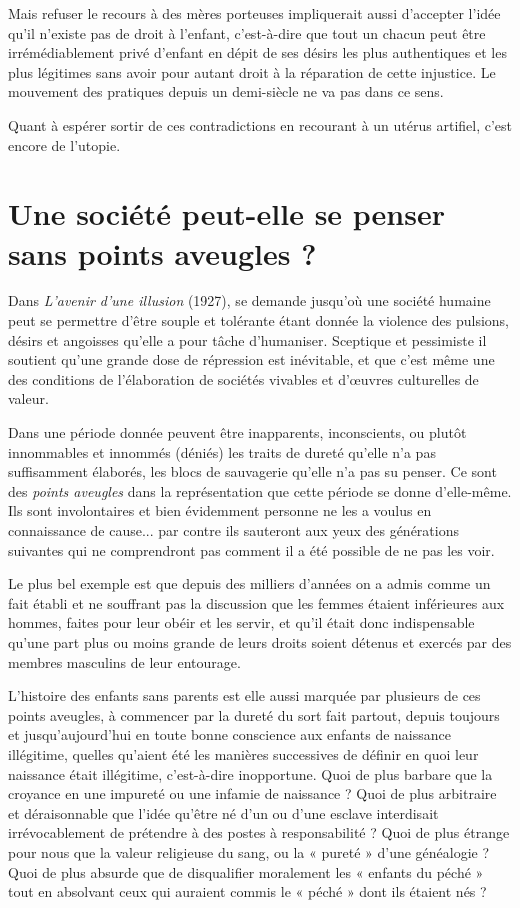   Mais refuser le recours à des mères porteuses impliquerait aussi d'accepter l'idée qu'il n'existe pas de droit à l'enfant, c'est-à-dire que tout un chacun peut être irrémédiablement privé d'enfant en dépit de ses désirs les plus authentiques et les plus légitimes sans avoir pour autant droit à la réparation de cette injustice. 
Le mouvement des pratiques depuis un demi-siècle ne va pas dans ce sens.

Quant à espérer sortir de ces contradictions en recourant à un utérus artifiel, c'est encore de l'utopie.
 
 
 
 
  
 
 

 \chapter{Une société peut-elle se penser sans points aveugles ?}
 
 Dans \emph{L'avenir d'une illusion} (1927),  se demande jusqu'où une société humaine peut se permettre d'être souple et tolérante étant donnée la violence des pulsions, désirs et angoisses qu'elle a pour tâche d'humaniser. Sceptique et pessimiste il soutient qu'une grande dose de répression est inévitable, et que c'est même une des conditions de l'élaboration de sociétés vivables et d'œuvres culturelles de valeur.

 Dans une période donnée peuvent être inapparents, inconscients, ou plutôt innommables et innommés (déniés) les traits de dureté qu'elle n'a pas suffisamment élaborés, les blocs de sauvagerie qu'elle n'a pas su penser. Ce sont des \emph{points aveugles} dans la représentation que cette période se donne d'elle-même. Ils sont involontaires et bien évidemment personne ne les a voulus en connaissance de cause... par contre ils sauteront aux yeux des générations suivantes qui ne comprendront pas comment il a été possible de ne pas les voir. 
 
 Le plus bel exemple est que depuis des milliers d'années on a admis comme un fait établi et ne souffrant pas la discussion que les femmes étaient inférieures aux hommes, faites pour leur obéir et les servir, et qu'il était donc indispensable qu'une part plus ou moins grande de leurs droits soient détenus et exercés par des membres masculins de leur entourage. 

 L'histoire des enfants sans parents est elle aussi marquée par plusieurs de ces points aveugles, à commencer par la dureté du sort fait partout, depuis toujours et jusqu'aujourd'hui en toute bonne conscience aux enfants de naissance illégitime, quelles qu'aient été les manières successives de définir en quoi leur naissance était illégitime, c'est-à-dire inopportune. Quoi de plus barbare que la croyance en une impureté ou une infamie de naissance ? Quoi de plus arbitraire et déraisonnable que l'idée qu'être né d'un ou d'une esclave interdisait irrévocablement de prétendre à des postes à responsabilité ? Quoi de plus étrange pour nous que la valeur religieuse du sang, ou la « pureté » d'une généalogie ? Quoi de plus absurde que de disqualifier moralement les « enfants du péché » tout en absolvant ceux qui auraient commis le « péché » dont ils étaient nés ? 

